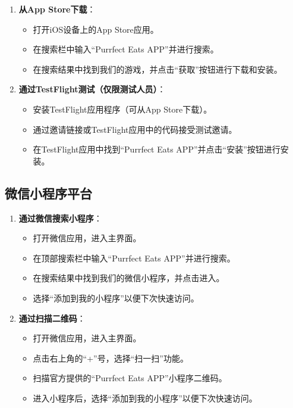 \documentclass{mancls}%
\begin{document}
\begin{enumerate}
  \item \textbf{从App Store下载}：
        \begin{itemize}
          \item 打开iOS设备上的App Store应用。
          \item 在搜索栏中输入“Purrfect Eats APP”并进行搜索。
          \item 在搜索结果中找到我们的游戏，并点击“获取”按钮进行下载和安装。
        \end{itemize}
  \item \textbf{通过TestFlight测试（仅限测试人员）}：
        \begin{itemize}
          \item 安装TestFlight应用程序（可从App Store下载）。
          \item 通过邀请链接或TestFlight应用中的代码接受测试邀请。
          \item 在TestFlight应用中找到“Purrfect Eats APP”并点击“安装”按钮进行安装。
        \end{itemize}
\end{enumerate}

\subsection{微信小程序平台}

\begin{enumerate}
  \item \textbf{通过微信搜索小程序}：
        \begin{itemize}
          \item 打开微信应用，进入主界面。
          \item 在顶部搜索栏中输入“Purrfect Eats APP”并进行搜索。
          \item 在搜索结果中找到我们的微信小程序，并点击进入。
          \item 选择“添加到我的小程序”以便下次快速访问。
        \end{itemize}
  \item \textbf{通过扫描二维码}：
        \begin{itemize}
          \item 打开微信应用，进入主界面。
          \item 点击右上角的“+”号，选择“扫一扫”功能。
          \item 扫描官方提供的“Purrfect Eats APP”小程序二维码。
          \item 进入小程序后，选择“添加到我的小程序”以便下次快速访问。
        \end{itemize}
\end{enumerate}
\end{document}
